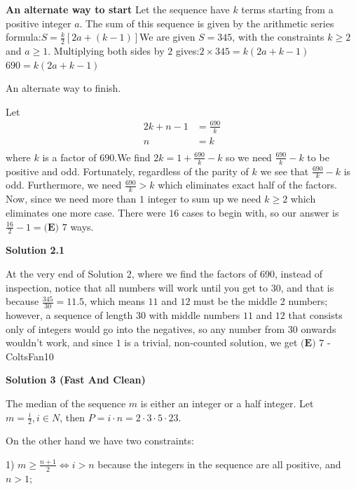 \begin{enumerate}
 


 \textbf{An alternate way to start} Let the sequence have \(k\) terms starting from a positive integer \(a\). The sum of this sequence is given by the arithmetic series formula:\(S=\frac{k}{2}[2a+(k-1)]\)We are given \(S = 345\), with the constraints \(k \geq 2\) and \(a \geq 1\). Multiplying both sides by \(2\) gives:\(2\times 345=k(2a+k-1)\)\(690=k(2a+k-1)\)

 


 An alternate way to finish.

 Let 
 \begin{align*} 2k+n-1 &=\frac{690}{k} \\ n &= k \\ \end{align*}
where $k$ is a factor of $690.$We find $2k = 1+\frac{690}{k}-k$ so we need $\frac{690}{k} - k$ to be positive and odd. Fortunately, regardless of the parity of $k$ we see that $\frac{690}{k} - k$ is odd. Furthermore, we need $\frac{690}{k} >k$ which eliminates exact half of the factors. Now, since we need more than $1$ integer to sum up we need $k \ge 2$ which eliminates one more case. There were $16$ cases to begin with, so our answer is $\frac{16}{2}-1 = \boxed{\textbf{(E) }7}$ ways.

 



\textbf{Solution 2.1}

At the very end of Solution 2, where we find the factors of 690, instead of inspection, notice that all numbers will work until you get to $30$, and that is because $\frac{345}{30}=11.5$, which means $11$ and $12$ must be the middle 2 numbers; however, a sequence of length $30$ with middle numbers $11$ and $12$ that consists only of integers would go into the negatives, so any number from 30 onwards wouldn't work, and since $1$ is a trivial, non-counted solution, we get $\boxed{\textbf{(E) }7}$ -ColtsFan10

 



\textbf{Solution 3 (Fast And Clean)}

The median of the sequence $m$ is either an integer or a half integer. Let $m=\frac{i}{2}, i \in N$, then $P=i\cdot n=2\cdot 3 \cdot 5 \cdot 23$. 

 On the other hand we have two constraints: 

 1) $m \geq \frac{n+1}{2} \iff i>n$ because the integers in the sequence are all positive, and $n>1$;


\end{enumerate}
